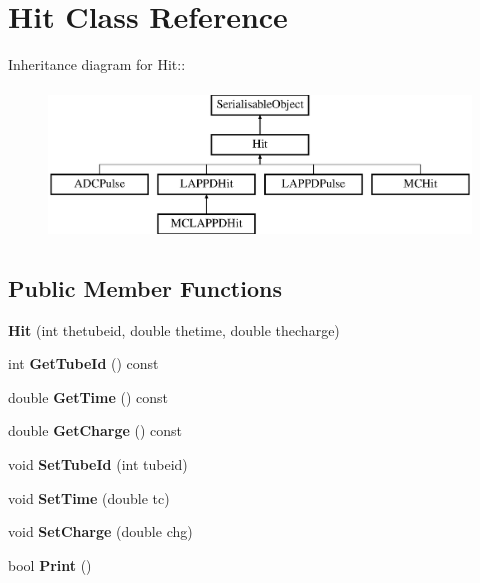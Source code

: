 \hypertarget{classHit}{
\section{Hit Class Reference}
\label{classHit}
}
Inheritance diagram for Hit::\begin{figure}[H]
\begin{center}
\leavevmode
\includegraphics[height=4cm]{classHit}
\end{center}
\end{figure}
\subsection*{Public Member Functions}
\begin{DoxyCompactItemize}
\item 
\hypertarget{classHit_a46c21425b896c5638598b4116de73740}{
{\bfseries Hit} (int thetubeid, double thetime, double thecharge)}
\label{classHit_a46c21425b896c5638598b4116de73740}

\item 
\hypertarget{classHit_ad4da9c11c8a203b65bd8b97b144a8133}{
int {\bfseries GetTubeId} () const }
\label{classHit_ad4da9c11c8a203b65bd8b97b144a8133}

\item 
\hypertarget{classHit_aa67ab762ecf9eab3d41147667447c597}{
double {\bfseries GetTime} () const }
\label{classHit_aa67ab762ecf9eab3d41147667447c597}

\item 
\hypertarget{classHit_a77e2a2c8ed9449b38fc00e1d516d122a}{
double {\bfseries GetCharge} () const }
\label{classHit_a77e2a2c8ed9449b38fc00e1d516d122a}

\item 
\hypertarget{classHit_a2f1d81f94c9cfc35ba664b94fd719156}{
void {\bfseries SetTubeId} (int tubeid)}
\label{classHit_a2f1d81f94c9cfc35ba664b94fd719156}

\item 
\hypertarget{classHit_af540ccdede0608cdd9ce6e754258b5e8}{
void {\bfseries SetTime} (double tc)}
\label{classHit_af540ccdede0608cdd9ce6e754258b5e8}

\item 
\hypertarget{classHit_aabbc33179a273289414263478835f2b9}{
void {\bfseries SetCharge} (double chg)}
\label{classHit_aabbc33179a273289414263478835f2b9}

\item 
\hypertarget{classHit_acebd1b0fb425a531faefed955f4c87e2}{
bool {\bfseries Print} ()}
\label{classHit_acebd1b0fb425a531faefed955f4c87e2}

\end{DoxyCompactItemize}
